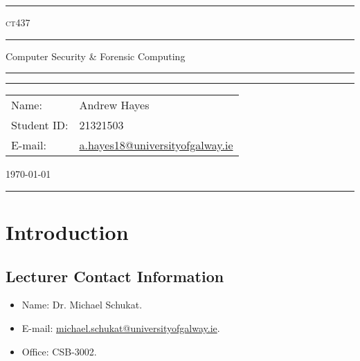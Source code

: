 \documentclass[a4paper,11pt]{article}
\author{Andrew Hayes}
\begin{document}
\begin{titlepage}
    \begin{center}
        \hrule
        \vspace*{0.6cm}
        \Huge \textsc{ct437}
        \vspace*{0.6cm}
        \hrule
        \LARGE
       \vspace{0.5cm}
       Computer Security \& Forensic Computing
       \vspace{0.5cm}
       \hrule

       \vfill

       \hrule
        \begin{minipage}{0.495\textwidth} 
            \vspace{0.4em}
            \raggedright
            \normalsize 
            \begin{tabular}{@{}l l}
                Name: & Andrew Hayes \\
                Student ID: & 21321503 \\
                E-mail: & \href{mailto://a.hayes18@universityofgalway.ie}{a.hayes18@universityofgalway.ie} \\
            \end{tabular}
        \end{minipage}
        \begin{minipage}{0.495\textwidth} 
            \raggedleft
            \vspace*{0.8cm}
            \Large
            \today
            \vspace*{0.6cm}
        \end{minipage}
        \medskip\hrule 
    \end{center}
\end{titlepage}

\newpage
\tableofcontents
\newpage
\setcounter{page}{1}

\section{Introduction}
\subsection{Lecturer Contact Information}
\begin{itemize}
    \item   Name: Dr. Michael Schukat.
    \item   E-mail: \href{mailto://michael.schukat@universityofgalway.ie}{michael.schukat@universityofgalway.ie}.
    \item   Office: CSB-3002.
\end{itemize}
\end{document}
